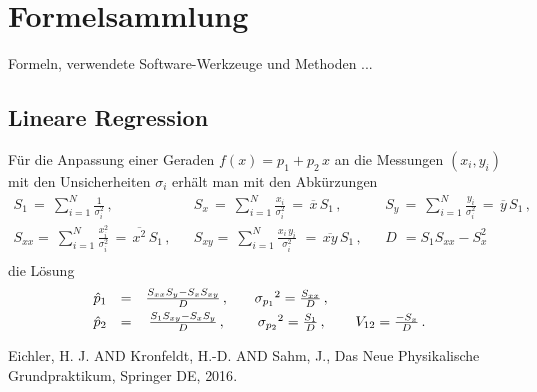 \documentclass[a4paper,10pt]{article}
\begin{document}
\section{Formelsammlung}

Formeln, verwendete Software-Werkzeuge und Methoden ...

\newcommand {\msum}{\displaystyle\sum}

\subsection{Lineare Regression}

Für die Anpassung einer Geraden $f(x)=p_1 + p_2 \, x$ 
an die Messungen $(x_i, y_i)$ mit den Unsicherheiten $\sigma_i$ 
erhält man mit den Abkürzungen
\begin{equation} \label{equ:formel2}
\begin{array}{lclcl}
S_{1~}  =~\msum_{i=1}^N \frac{1}{\sigma_i^2}\,,   &  &
S_{x~}  =~ \msum_{i=1}^N \frac{x_i}{\sigma_i^2}\,=\,\overline{x}\,S_1 \,,&  &
S_{y~}  =~ \msum_{i=1}^N \frac{y_i}{\sigma_i^2}\,=\,\overline{y}\,S_1 \,,\\[0.3pc]
S_{xx}  =~ \msum_{i=1}^N \frac{x_i^2}{\sigma_i^2}\,=\,\overline{x^2}\,S_1 \,,&  &
S_{xy}  =~ \msum_{i=1}^N \frac{x_i\,y_i}{\sigma_i^2}\,\,=\,\overline{xy}\,S_1 \,, & &
D_{~~}  =  {S_1S_{xx}-S_x^2} \\
\end{array}
\end{equation}
die Lösung
\[ \begin{array}{ccc c c c c }
\hat p_1&=&\frac{S_{xx}S_y-S_xS_{xy}}{D}\,, & & 
{\sigma_{p_1}}^2=\frac{S_{xx}}{D}\,, \\[0.3pc]
\hat p_2&=&\frac{S_1S_{xy}-S_xS_y}{D}\,,   & &
{\sigma_{p_2}}^2=\frac{S_{1}}{D}\,,        & & 
V_{12}=\frac{-S_{x}}{D}\,.           \\
\end{array}
\]


\begin{thebibliography}{000}
      {Eichler, H. J. AND Kronfeldt, H.-D. AND Sahm, J.},
                     {Das Neue Physikalische Grundpraktikum}, {Springer DE},
                     {2016}.
\end{thebibliography}
\end{document}
